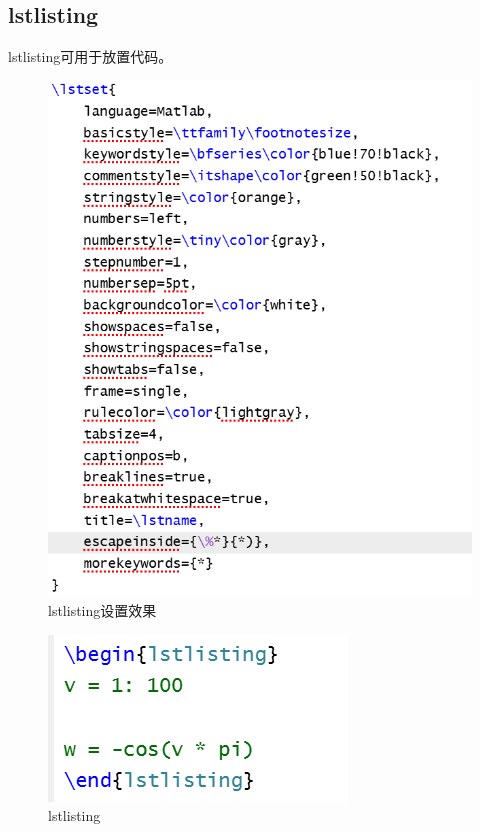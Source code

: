 \documentclass{article}
\begin{document}
\subsection{lstlisting}
lstlisting可用于放置代码。
\begin{figure}[H]
    \centering
    \includegraphics[width=1\linewidth]{lstlisting1.png}
    \caption{lstlisting设置效果}
\end{figure}

\begin{figure}[H]
    \centering
    \includegraphics[width=1\linewidth]{lstlisting2.png}
    \caption{lstlisting}
\end{figure}
\end{document}
